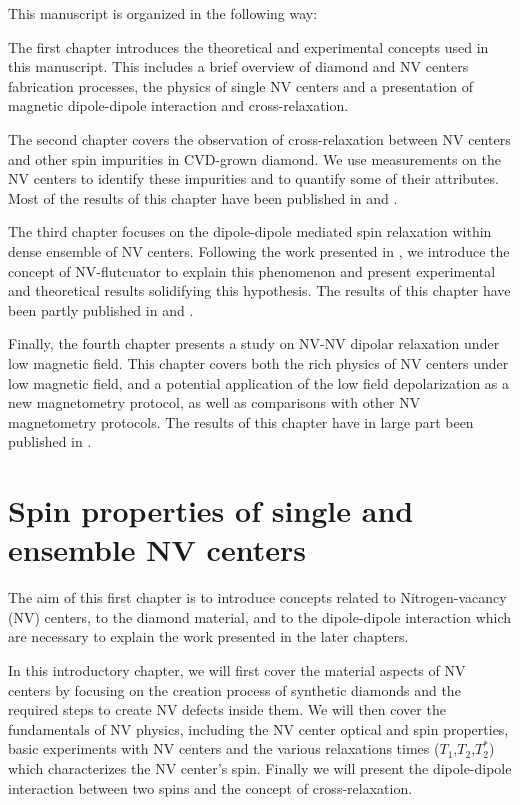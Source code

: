 \documentclass[a4paper, 11pt]{book}
\begin{document}
\bigskip
This manuscript is organized in the following way:

\medskip
The first chapter introduces the theoretical and experimental concepts used in this manuscript. This includes a brief overview of diamond and NV centers fabrication processes, the physics of single NV centers and a presentation of magnetic dipole-dipole interaction and cross-relaxation.

The second chapter covers the observation of cross-relaxation between NV centers and other spin impurities in CVD-grown diamond. We use measurements on the NV centers to identify these impurities and to quantify some of their attributes. Most of the results of this chapter have been published in  \citep{pellet2021optical} and \citep{ngambou2022improving}.

The third chapter focuses on the dipole-dipole mediated spin relaxation within dense ensemble of NV centers. Following the work presented in \citep{choi2017depolarization}, we introduce the concept of NV-flutcuator to explain this phenomenon and present experimental and theoretical results solidifying this hypothesis. The results of this chapter have been partly published in \citep{pellet2022spin} and \citep{pellet2021magnetic}.

Finally, the fourth chapter presents a study on NV-NV dipolar relaxation under low magnetic field. This chapter covers both the rich physics of NV centers under low magnetic field, and a potential application of the low field depolarization as a new magnetometry protocol, as well as comparisons with other NV magnetometry protocols. The results of this chapter have in large part been published in \citep{pellet2022spin}.


\chapter{Spin properties of single and ensemble NV centers}
The aim of this first chapter is to introduce concepts related to Nitrogen-vacancy (NV) centers, to the diamond material, and to the dipole-dipole interaction which are necessary to explain the work presented in the later chapters.

In this introductory chapter, we will first cover the material aspects of NV centers by focusing on the creation process of synthetic diamonds and the required steps to create NV defects inside them. We will then cover the fundamentals of NV physics, including the NV center optical and spin properties, basic experiments with NV centers and the various relaxations times ($T_1$,$T_2$,$T_2^*$) which characterizes the NV center's spin. Finally we will present the dipole-dipole interaction between two spins and the concept of cross-relaxation.
\end{document}
